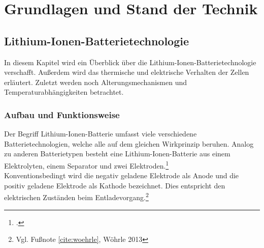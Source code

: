 \section{Grundlagen und Stand der Technik}\label{sec:GrundlagenUSdT}

\subsection{Lithium-Ionen-Batterietechnologie}\label{subsec:LIB}

In diesem Kapitel wird ein Überblick über die Lithium-Ionen-Batterietechnologie verschafft. Außerdem wird das thermische und elektrische Verhalten der Zellen erläutert. Zuletzt werden noch Alterungsmechanismen und Temperaturabhängigkeiten betrachtet.

\subsubsection*{Aufbau und Funktionsweise}\label{subsec*:LIBAufbau}

Der Begriff Lithium-Ionen-Batterie umfasst viele verschiedene Batterietechnologien, welche alle auf dem gleichen Wirkprinzip beruhen. Analog zu anderen Batterietypen besteht eine Lithium-Ionen-Batterie aus einem Elektrolyten, einem Separator und zwei Elektroden.\footcite[Vgl.\label{cite:woehrle}][S.107-117]{Wohrle2013}\\
Konventionsbedingt wird die negativ geladene Elektrode als Anode und die positiv geladene Elektrode als Kathode bezeichnet. Dies entspricht den elektrischen Zuständen beim Entladevorgang.\footnote{Vgl. Fußnote \ref{cite:woehrle}, Wöhrle 2013}\\

